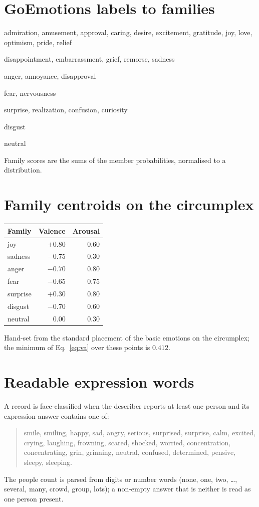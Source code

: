 \section{GoEmotions labels to families}
\begin{description}\setlength{\itemsep}{1pt}
\item[joy] admiration, amusement, approval, caring, desire, excitement, gratitude, joy, love, optimism, pride, relief
\item[sadness] disappointment, embarrassment, grief, remorse, sadness
\item[anger] anger, annoyance, disapproval
\item[fear] fear, nervousness
\item[surprise] surprise, realization, confusion, curiosity
\item[disgust] disgust
\item[neutral] neutral
\end{description}
Family scores are the sums of the member probabilities, normalised to a distribution.

\section{Family centroids on the circumplex}
\begin{center}
\begin{tabular}{lrr}
\toprule
Family & Valence & Arousal \\
\midrule
joy & $+0.80$ & $0.60$ \\
sadness & $-0.75$ & $0.30$ \\
anger & $-0.70$ & $0.80$ \\
fear & $-0.65$ & $0.75$ \\
surprise & $+0.30$ & $0.80$ \\
disgust & $-0.70$ & $0.60$ \\
neutral & $0.00$ & $0.30$ \\
\bottomrule
\end{tabular}
\end{center}
Hand-set from the standard placement of the basic emotions on the circumplex; the minimum of Eq.~\ref{eq:va} over these points is $0.412$.

\section{Readable expression words}
A record is face-classified when the describer reports at least one person and its expression answer contains one of:
\begin{quote}
smile, smiling, happy, sad, angry, serious, surprised, surprise, calm, excited, crying, laughing, frowning, scared, shocked, worried, concentration, concentrating, grin, grinning, neutral, confused, determined, pensive, sleepy, sleeping.
\end{quote}
The people count is parsed from digits or number words (none, one, two, \dots, several, many, crowd, group, lots); a non-empty answer that is neither is read as one person present.

